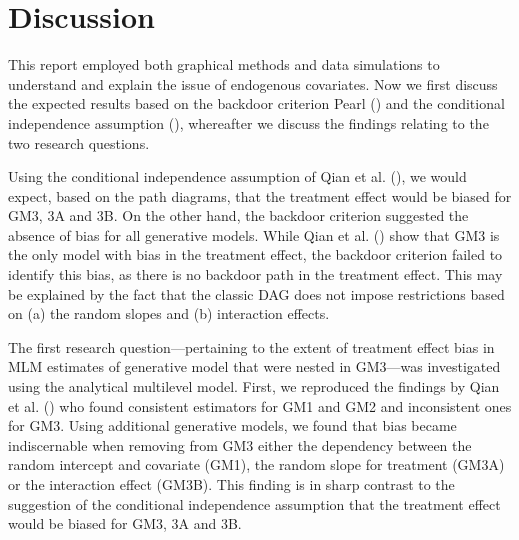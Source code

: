 \documentclass[
  12pt,
  a4paper,
]{article}
\begin{document}
\section{Discussion}\label{discussion}

This report employed both graphical methods and data simulations to
understand and explain the issue of endogenous covariates. Now we first
discuss the expected results based on the backdoor criterion Pearl
() and the conditional independence
assumption (), whereafter we
discuss the findings relating to the two research questions.

Using the conditional independence assumption of Qian et al.
(), we would expect, based on the path
diagrams, that the treatment effect would be biased for GM3, 3A and 3B.
On the other hand, the backdoor criterion suggested the absence of bias
for all generative models. While Qian et al.
() show that GM3 is the only model with
bias in the treatment effect, the backdoor criterion failed to identify
this bias, as there is no backdoor path in the treatment effect. This
may be explained by the fact that the classic DAG does not impose
restrictions based on (a) the random slopes and (b) interaction effects.

The first research question---pertaining to the extent of treatment
effect bias in MLM estimates of generative model that were nested in
GM3---was investigated using the analytical multilevel model. First, we
reproduced the findings by Qian et al. ()
who found consistent estimators for GM1 and GM2 and inconsistent ones
for GM3. Using additional generative models, we found that bias became
indiscernable when removing from GM3 either the dependency between the
random intercept and covariate (GM1), the random slope for treatment
(GM3A) or the interaction effect (GM3B). This finding is in sharp
contrast to the suggestion of the conditional independence assumption
that the treatment effect would be biased for GM3, 3A and 3B.
\end{document}
